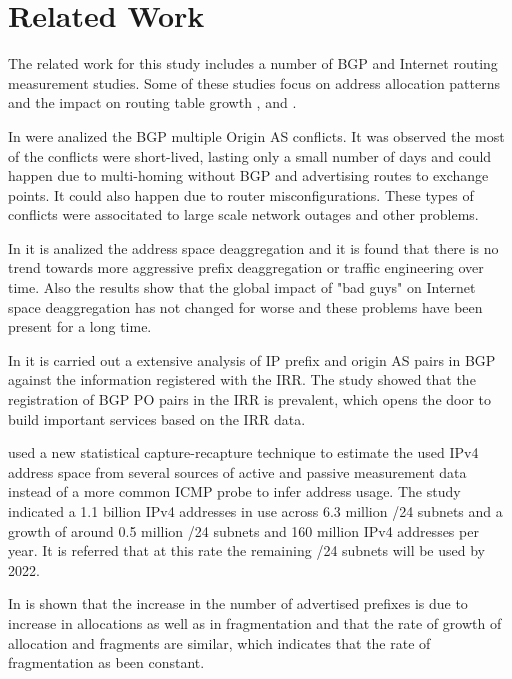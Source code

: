 \documentclass[11pt,a4paper]{scrreprt}
\begin{document}
\chapter{Related Work}

The related work for this study includes a number of BGP and Internet routing measurement studies. Some of these studies focus on address allocation patterns and the impact on routing table growth \cite{Impact_Structure_Routing_Tables}, \cite{Slowing_Routing_Table_Growth} and \cite{BGP_Routing_Table_Evolution}.

In \cite{MOAS} were analized the BGP multiple Origin AS conflicts. It was observed the most of the conflicts were short-lived, lasting only a small number of days and could happen due to multi-homing without BGP and advertising routes to exchange points. It could also happen due to router misconfigurations. These types of conflicts were associtated to large scale network outages and other problems. 

In \cite{Address_Space_Deaggregation} it is analized the address space deaggregation and it is found that there is no trend towards more aggressive prefix deaggregation or traffic engineering over time. Also the results show that the global impact of "bad guys" on Internet space deaggregation has not changed for worse and these problems have been present for a long time.

In \cite{Comparative_BGP_IRR} it is carried out a extensive analysis of IP prefix and origin AS pairs in BGP against the information registered with the IRR. The study showed that the registration of BGP PO pairs in the IRR is prevalent, which opens the door to build important services based on the IRR data.

\cite{Capturing_Ghosts} used a new statistical capture-recapture technique to estimate the used IPv4 address space from several sources of active and passive measurement data instead of a more common ICMP probe to infer address usage. The study indicated a 1.1 billion IPv4 addresses in use across 6.3 million /24 subnets and a growth of around 0.5 million /24 subnets and 160 million IPv4 addresses per year. It is referred that at this rate the remaining /24 subnets will be used by 2022.

In \cite{Delegation_Structure} is shown that the increase in the number of advertised prefixes is due to increase in allocations as well as in fragmentation and that the rate of growth of allocation and fragments are similar, which indicates that the rate of fragmentation as been constant.
\end{document}
